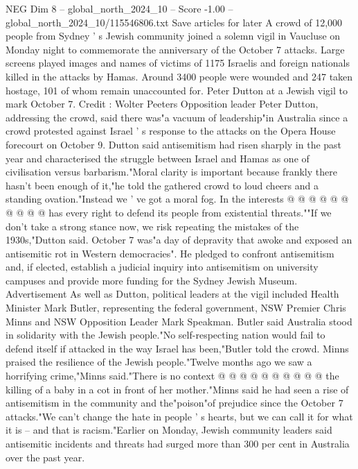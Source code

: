 \begin{textsample}{NEG Dim 8 – global\_north\_2024\_10 – Score -1.00 – global\_north\_2024\_10/115546806.txt}  \label{ex:f8_neg_294}
Save articles for later A crowd of 12,000 people from Sydney ' s Jewish community joined a solemn vigil in Vaucluse on Monday night to commemorate the anniversary of the October 7 attacks.
Large screens played images and names of victims of 1175 Israelis and foreign nationals killed in the attacks by Hamas.
Around 3400 people were wounded and 247 taken hostage, 101 of whom remain unaccounted for.
Peter Dutton at a Jewish vigil to mark October 7.
Credit : Wolter Peeters Opposition leader Peter Dutton, addressing the crowd, said there was"a vacuum of leadership"in Australia since a crowd protested against Israel ' s response to the attacks on the Opera House forecourt on October 9.
Dutton said antisemitism had risen sharply in the past year and characterised the struggle between Israel and Hamas as one of civilisation versus barbarism."Moral clarity is important because frankly there hasn't been enough of it,"he told the gathered crowd to loud cheers and a standing ovation."Instead we ' ve got a moral fog.
In the interests @ @ @ @ @ @ @ @ @ @ has every right to defend its people from existential threats.""If we don't take a strong stance now, we risk repeating the mistakes of the 1930s,"Dutton said.
October 7 was"a day of depravity that awoke and exposed an antisemitic rot in Western democracies".
He pledged to confront antisemitism and, if elected, establish a judicial inquiry into antisemitism on university campuses and provide more funding for the Sydney Jewish Museum.
Advertisement As well as Dutton, political leaders at the vigil included Health Minister Mark Butler, representing the federal government, NSW Premier Chris Minns and NSW Opposition Leader Mark Speakman.
Butler said Australia stood in solidarity with the Jewish people."No self-respecting nation would fail to defend itself if attacked in the way Israel has been,"Butler told the crowd.
Minns praised the resilience of the Jewish people."Twelve months ago we saw a horrifying crime,"Minns said."There is no context @ @ @ @ @ @ @ @ @ @ the killing of a baby in a cot in front of her mother."Minns said he had seen a rise of antisemitism in the community and the"poison"of prejudice since the October 7 attacks."We can't change the hate in people ' s hearts, but we can call it for what it is -- and that is racism."Earlier on Monday, Jewish community leaders said antisemitic incidents and threats had surged more than 300 per cent in Australia over the past year.

\end{textsample}
